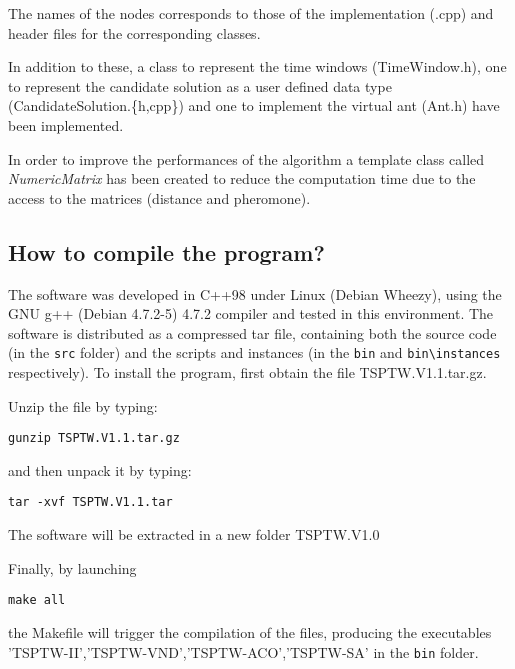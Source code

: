 \documentclass{article}
\begin{document}
The names of the nodes corresponds to those of the implementation (.cpp) and header files for the corresponding classes.

In addition to these, a class to represent the time windows (TimeWindow.h), one to represent the candidate solution as
a user defined data type (CandidateSolution.\{h,cpp\}) and one to implement the virtual ant (Ant.h) have been implemented.

In order to improve the performances of the algorithm a template class called \emph{NumericMatrix} has been created to reduce the computation time due to the access to the matrices (distance and pheromone).

\subsection{How to compile the program?}
The software was developed in C++98 under Linux (Debian Wheezy), using the GNU g++ (Debian 4.7.2-5) 4.7.2 compiler and tested in this environment. 
The software is distributed as a compressed tar file, containing both the source code (in the \verb|src| folder) and the scripts and instances (in the \verb|bin| and \verb|bin\instances| respectively).
To install the program, first obtain the file TSPTW.V1.1.tar.gz. 

Unzip the file by typing:

\begin{center}
\begin{verbatim}
gunzip TSPTW.V1.1.tar.gz
\end{verbatim}
\end{center}

and then unpack it by typing:

\begin{center}
\begin{verbatim}
tar -xvf TSPTW.V1.1.tar
\end{verbatim}
\end{center}

The software will be extracted in a new folder TSPTW.V1.0 

Finally, by launching
\begin{center}
\begin{verbatim}
make all
\end{verbatim}
\end{center}

the Makefile will trigger the compilation of the files,
producing the executables 'TSPTW-II','TSPTW-VND','TSPTW-ACO','TSPTW-SA' in the \verb|bin| folder.
\end{document}
